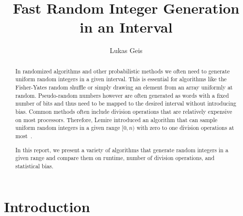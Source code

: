 \documentclass[a4paper, UKenglish, cleveref, autoref, thm-restate]{lipics-v2021}
\title{Fast Random Integer Generation in an Interval}
\author{Lukas Geis}{Goethe Universität Frankfurt am Main}{s2949316@stud.uni-frankfurt.de}{}{}
\begin{document}
\maketitle


\begin{abstract}
    In randomized algorithms and other probabilistic methods we often need to generate uniform random integers in a given interval.
    This is essential for algorithms like the Fisher-Yates random shuffle or simply drawing an element from an array uniformly at random.
    Pseudo-random numbers however are often generated as words with a fixed number of bits and thus need to be mapped to the desired interval without introducing bias.
    Common methods often include division operations that are relatively expensive on most processors.
    Therefore, Lemire introduced an algorithm that can sample uniform random integers in a given range $[0,n)$ with zero to one division operations at most~\cite{Lemire}.

    In this report, we present a variety of algorithms that generate random integers in a given range and compare them on runtime, number of division operations, and statistical bias.
\end{abstract}


\section{Introduction}
\end{document}

